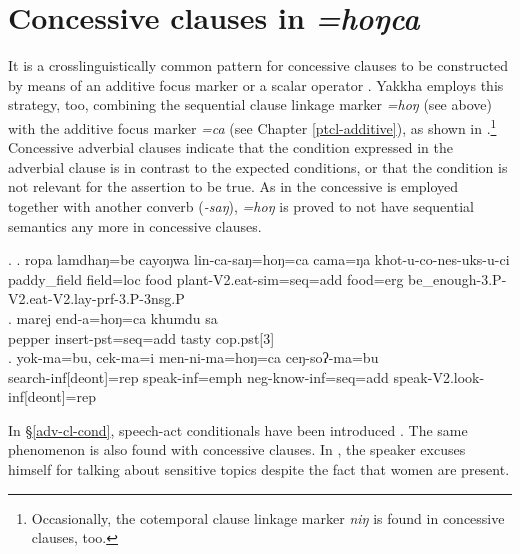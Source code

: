 \section{Concessive clauses in \emph{=hoŋca}}\label{adv-cl-conc}

It is a crosslinguistically common pattern for concessive clauses to be constructed by means of an additive focus marker or a scalar operator \citep[980]{Koenig1993_Focus}. Yakkha employs this strategy, too, combining the sequential clause linkage marker  \emph{=hoŋ} (see above) with the additive focus marker \emph{=ca} (see Chapter \ref{ptcl-additive}), as shown in \Next.\footnote{Occasionally, the  cotemporal clause linkage marker \emph{niŋ} is found in concessive clauses, too.} Concessive adverbial clauses indicate that the condition expressed in the adverbial clause is in contrast to the expected conditions, or that the condition is not relevant for the assertion to be true. As in \Next[a] the concessive is employed together with another converb (\emph{-saŋ}),  \emph{=hoŋ} is proved to not have sequential semantics any more in concessive clauses.

\ex. \ag. ropa  lamdhaŋ=be    cayoŋwa  lin-ca-saŋ=hoŋ=ca                       cama=ŋa   khot-u-co-nes-uks-u-ci\\
paddy\_field field{\sc =loc} food plant{\sc -V2.eat-sim=seq=add} food{\sc =erg} be\_enough{\sc -3.P-V2.eat-V2.lay-prf-3.P-3nsg.P}\\
 
\bg. marej end-a=hoŋ=ca khumdu sa\\
 pepper insert{\sc [3sg]-pst=seq=add} tasty {\sc cop.pst[3]}\\
 \bg. yok-ma=bu, cek-ma=i men-ni-ma=hoŋ=ca ceŋ-soʔ-ma=bu\\
 search{\sc -inf[deont]=rep} speak{\sc -inf=emph} {\sc neg-}know{\sc -inf=seq=add} speak{\sc -V2.look-inf[deont]=rep}\\
 
 In §\ref{adv-cl-cond}, speech-act conditionals have been introduced \citep{Thompsonetal2007_Adverbial}. The same phenomenon is also found with concessive clauses. In \Next, the speaker excuses himself for talking about sensitive topics despite the fact that women are present. 
 

